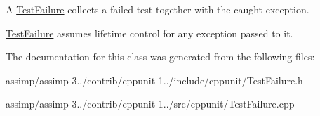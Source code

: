 A \hyperlink{class_test_failure}{Test\+Failure} collects a failed test together with the caught exception. 

\hyperlink{class_test_failure}{Test\+Failure} assumes lifetime control for any exception passed to it. 

The documentation for this class was generated from the following files\+:\begin{DoxyCompactItemize}
\item 
assimp/assimp-\/3../contrib/cppunit-\/1../include/cppunit/Test\+Failure.\+h\item 
assimp/assimp-\/3../contrib/cppunit-\/1../src/cppunit/Test\+Failure.\+cpp\end{DoxyCompactItemize}
